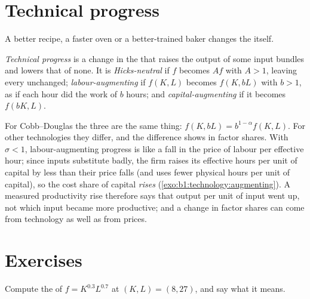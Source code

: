 \section{Technical progress}\label{sec:b1:technology:progress}

A better recipe, a faster oven or a better-trained baker changes the
 itself.

\begin{definition}\label{def:b1:technology:technical-progress}
\emph{Technical progress} is a change in the  that
raises the output of some input bundles and lowers that of none. It is
\emph{Hicks-neutral} if $f$ becomes $Af$ with $A > 1$, leaving every 
unchanged; \emph{labour-augmenting} if $f(K, L)$ becomes $f(K, bL)$ with
$b > 1$, as if each hour did the work of $b$ hours; and
\emph{capital-augmenting} if it becomes $f(bK, L)$.
\end{definition}

For Cobb--Douglas the three are the same thing: $f(K, bL) = b^{1-\alpha}f(K, L)$.
For other technologies they differ, and the difference shows in factor
shares. With $\sigma < 1$, labour-augmenting progress is like a fall in the
price of labour per effective hour; since inputs substitute badly, the firm
raises its effective hours per unit of capital by less than their price
falls (and uses fewer physical hours per unit of capital), so the cost
share of capital \emph{rises} (\cref{exo:b1:technology:augmenting}). A measured
productivity rise therefore says that output per unit of input went up,
not which input became more productive; and a change in factor shares can
come from technology as well as from prices.

\section*{Exercises}\label{sec:b1:technology:exercises}

\begin{exercise}[$\star$]\label{exo:b1:technology:mrts-cd}
Compute the  of $f = K^{0.3}L^{0.7}$ at $(K, L) = (8, 27)$, and say what it means.
\end{exercise}

